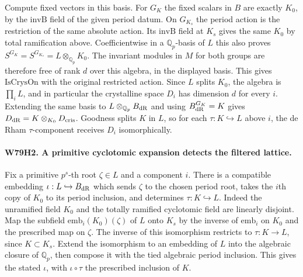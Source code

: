 Compute fixed vectors in this basis. For $G_K$ the fixed
scalars in $B$ are exactly $K_0$, by the $\mathrm{invB}$ field
of the given period datum. On $G_{K_s}$ the period action is the
restriction of the same absolute action. Its $\mathrm{invB}$ field
at $K_s$ gives the same $K_0$ by total ramification above.
Coefficientwise in a $\mathbb Q_p$-basis of $L$ this also proves
$S^{G_K}=S^{G_{K_s}}=L\otimes_{\mathbb Q_p} K_0$.
The invariant modules in $M$ for both groups are therefore
free of rank $d$ over this algebra, in the displayed basis. This
gives $\mathrm{IsCrysOn}$ with the original restricted action.
Since $L$ splits $K_0$, the algebra is $\prod_i L$, and in
particular the crystalline space $D_i$ has dimension $d$ for
every $i$. Extending the same basis to
$L\otimes_{\mathbb Q_p}B_{\rm dR}$ and using
$B_{\rm dR}^{G_K}=K$ gives
$D_{\rm dR}=K\otimes_{K_0}D_{\rm cris}$. Goodness splits $K$ in
$L$, so for each $\tau:K\hookrightarrow L$ above $i$, the
de Rham $\tau$-component receives $D_i$ isomorphically.

\paragraph{W79H2. A primitive cyclotomic expansion detects the filtered lattice.}
Fix a primitive $p^s$-th root $\zeta\in L$ and a component $i$.
There is a compatible embedding $\iota:L\hookrightarrow B_{\rm dR}$
which sends $\zeta$ to the chosen period root, takes the $i$th
copy of $K_0$ to its period inclusion, and determines
$\tau:K\hookrightarrow L$. Indeed the unramified field $K_0$
and the totally ramified cyclotomic field are linearly disjoint.
Map the subfield $\mathrm{emb}_i(K_0)(\zeta)$ of $L$ onto $K_s$
by the inverse of $\mathrm{emb}_i$ on $K_0$ and the prescribed
map on $\zeta$. The inverse of this isomorphism restricts to
$\tau:K\to L$, since $K\subset K_s$. Extend the isomorphism to
an embedding of $L$ into the algebraic closure of $\mathbb Q_p$,
then compose it with the tied algebraic period inclusion. This
gives the stated $\iota$, with $\iota\circ\tau$ the prescribed
inclusion of $K$.

